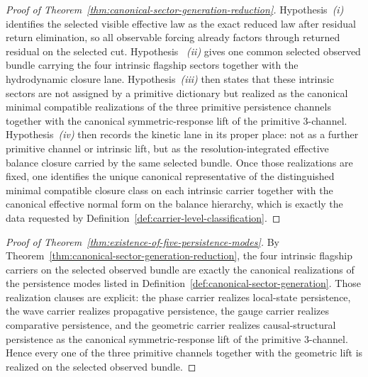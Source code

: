 \begin{proof}[Proof of Theorem~\ref{thm:canonical-sector-generation-reduction}]
\label{proof:thm:canonical-sector-generation-reduction}
Hypothesis~\emph{(i)} identifies the selected visible effective law as the
exact reduced law after residual return elimination, so all observable forcing
already factors through returned residual on the selected cut. Hypothesis
~\emph{(ii)} gives one common selected observed bundle carrying the four
intrinsic flagship sectors together with the hydrodynamic closure lane.
Hypothesis~\emph{(iii)} then states that these intrinsic sectors are not
assigned by a primitive dictionary but realized as the canonical minimal
compatible realizations of the three primitive persistence channels together
with the canonical symmetric-response lift of the primitive \(3\)-channel.
Hypothesis~\emph{(iv)} then records the kinetic lane in its proper place: not
as a further primitive channel or intrinsic lift, but as the
resolution-integrated effective balance closure carried by the same selected
bundle. Once those realizations are fixed, one identifies the unique canonical
representative of the distinguished minimal compatible closure class on each
intrinsic carrier together with the canonical effective normal form on the
balance hierarchy, which is exactly the data requested by
Definition~\ref{def:carrier-level-classification}.
\end{proof}

\begin{proof}[Proof of Theorem~\ref{thm:existence-of-five-persistence-modes}]
\label{proof:thm:existence-of-five-persistence-modes}
By Theorem~\ref{thm:canonical-sector-generation-reduction}, the four intrinsic
flagship carriers on the selected observed bundle are exactly the canonical
realizations of the persistence modes listed in
Definition~\ref{def:canonical-sector-generation}. Those realization clauses are
explicit: the phase carrier realizes local-state persistence, the wave carrier
realizes propagative persistence, the gauge carrier realizes comparative
persistence, and the geometric carrier realizes causal-structural persistence
as the canonical symmetric-response lift of the primitive \(3\)-channel. Hence
every one of the three primitive channels together with the geometric lift is
realized on the selected observed bundle.
\end{proof}

